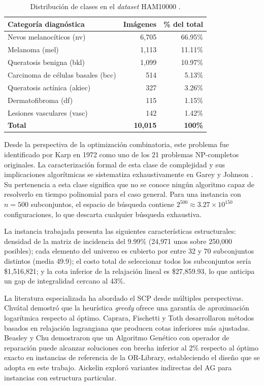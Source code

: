 \documentclass[conference]{IEEEtran}
\begin{document}
\begin{table}[htbp]
\caption{Distribución de clases en el \textit{dataset} HAM10000 \cite{tschandl2018}.}
\label{tab:ham10000}
\centering
\begin{tabular}{lrr}
\toprule
\textbf{Categoría diagnóstica} & \textbf{Imágenes} & \textbf{\% del total} \\
\midrule
Nevos melanocíticos (nv)         & 6{,}705 & 66.95\% \\
Melanoma (mel)                   & 1{,}113 & 11.11\% \\
Queratosis benigna (bkl)         & 1{,}099 & 10.97\% \\
Carcinoma de células basales (bcc) & 514   &  5.13\% \\
Queratosis actínica (akiec)      &   327   &  3.26\% \\
Dermatofibroma (df)              &   115   &  1.15\% \\
Lesiones vasculares (vasc)       &   142   &  1.42\% \\
\midrule
\textbf{Total}                   & \textbf{10{,}015} & \textbf{100\%} \\
\bottomrule
\end{tabular}
\end{table}

Desde la perspectiva de la optimización combinatoria, este problema fue identificado por Karp \cite{karp1972} en 1972 como uno de los 21 problemas NP-completos originales. La caracterización formal de esta clase de complejidad y sus implicaciones algorítmicas se sistematiza exhaustivamente en Garey y Johnson \cite{garey1979}. Su pertenencia a esta clase significa que no se conoce ningún algoritmo capaz de resolverlo en tiempo polinomial para el caso general. Para una instancia con $n=500$ subconjuntos, el espacio de búsqueda contiene $2^{500} \approx 3.27 \times 10^{150}$ configuraciones, lo que descarta cualquier búsqueda exhaustiva.

La instancia trabajada presenta las siguientes características estructurales: densidad de la matriz de incidencia del 9.99\% (24{,}971 unos sobre 250{,}000 posibles); cada elemento del universo es cubierto por entre 32 y 70 subconjuntos distintos (media 49.9); el costo total de seleccionar todos los subconjuntos sería \$1{,}516{,}821; y la cota inferior de la relajación lineal es \$27{,}859.93, lo que anticipa un gap de integralidad cercano al 43\%.

La literatura especializada ha abordado el SCP desde múltiples perspectivas. Chvátal \cite{chvatal1979} demostró que la heurística \textit{greedy} ofrece una garantía de aproximación logarítmica respecto al óptimo. Caprara, Fischetti y Toth \cite{caprara1999} desarrollaron métodos basados en relajación lagrangiana que producen cotas inferiores más ajustadas. Beasley y Chu \cite{beasley1996} demostraron que un Algoritmo Genético con operador de reparación puede alcanzar soluciones con brecha inferior al 2\% respecto al óptimo exacto en instancias de referencia de la OR-Library, estableciendo el diseño que se adopta en este trabajo. Aickelin \cite{aickelin2002} exploró variantes indirectas del AG para instancias con estructura particular.
\end{document}

